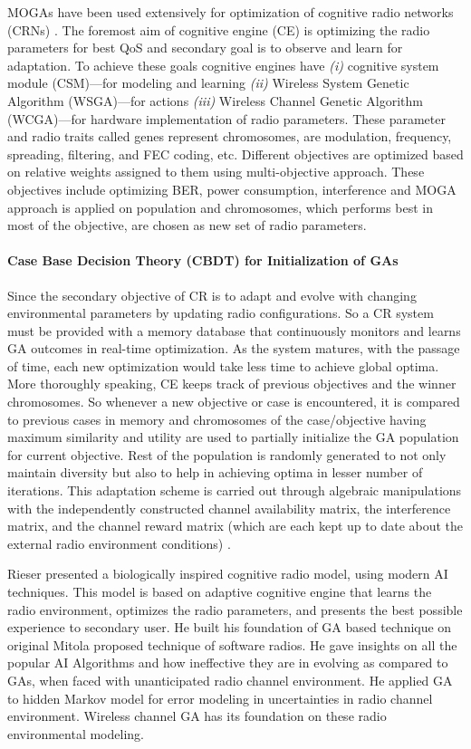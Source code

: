 \documentclass[journal]{IEEEtran}
\begin{document}
MOGAs have been used extensively for optimization of cognitive radio networks (CRNs) \cite{fette2009cognitive}. The foremost aim of cognitive engine (CE) is optimizing the radio parameters for best QoS and secondary goal is to observe and learn for adaptation. To achieve these goals cognitive engines have \emph{(i)} cognitive system module (CSM)---for modeling and learning \emph{(ii)} Wireless System Genetic Algorithm (WSGA)---for actions \emph{(iii)} Wireless Channel Genetic Algorithm (WCGA)---for hardware implementation of radio parameters. These parameter and radio traits called genes represent chromosomes, are modulation, frequency, spreading, filtering, and FEC coding, etc. Different objectives are optimized based on relative weights assigned to them using multi-objective approach. These objectives include optimizing BER, power consumption, interference and MOGA approach is applied on population and chromosomes, which performs best in most of the objective, are chosen as new set of radio parameters.

\paragraph*{Case Base Decision Theory (CBDT) for Initialization of GAs}

Since the secondary objective of CR is to adapt and evolve with changing environmental parameters by updating radio configurations. So a CR system must be provided with a memory database that continuously monitors and learns GA outcomes in real-time optimization. As the system matures, with the passage of time, each new optimization would take less time to achieve global optima. More thoroughly speaking, CE keeps track of previous objectives and the winner chromosomes. So whenever a new objective or case is encountered, it is compared to previous cases in memory and chromosomes of the case/objective having maximum similarity and utility are used to partially initialize the GA population for current objective. Rest of the population is randomly generated to not only maintain diversity but also to help in achieving optima in lesser number of iterations. This adaptation scheme is carried out through algebraic manipulations with the independently constructed channel availability matrix, the interference matrix, and the channel reward matrix (which are each kept up  to date about the external radio environment conditions) \cite{ye2010genetic}.

Rieser \cite{rieser2004biologically} presented a biologically inspired cognitive radio model, using modern AI techniques. This model is based on adaptive cognitive engine that learns the radio environment, optimizes the radio parameters, and presents the best possible experience to secondary user. He built his foundation of GA based technique on original Mitola \cite{mitola2006cognitive} proposed technique of software radios. He gave insights on all the popular AI Algorithms and how ineffective they are in evolving as compared to GAs, when faced with unanticipated radio channel environment. He applied GA to hidden Markov model for error modeling in uncertainties in radio channel environment. Wireless channel GA has its foundation on these radio environmental modeling.
\end{document}
